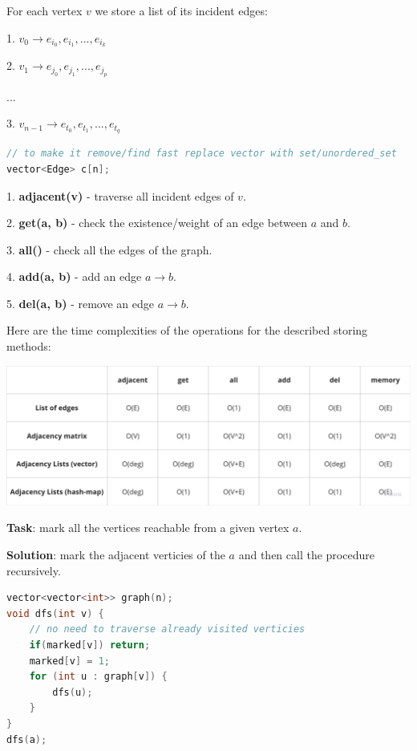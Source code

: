 For each vertex $v$ we store a list of its incident edges:

1. $v_0 \to e_{i_0}, e_{i_1}, ..., e_{i_k}$

2. $v_1 \to e_{j_0}, e_{j_1}, ..., e_{j_p}$

...

3. $v_{n-1} \to e_{t_0}, e_{t_1}, ..., e_{t_q}$

\begin{lstlisting}[language=C++]
// to make it remove/find fast replace vector with set/unordered_set
vector<Edge> c[n];
\end{lstlisting}


1. \textbf{adjacent(v)} - traverse all incident edges of $v$.

2. \textbf{get(a, b)} - check the existence/weight of an edge between $a$ and $b$.

3. \textbf{all()} - check all the edges of the graph.

4. \textbf{add(a, b)} - add an edge $a \to b$.

5. \textbf{del(a, b)} - remove an edge $a \to b$.

Here are the time complexities of the operations for the described storing methods:

\begin{center}
    \includegraphics[scale=0.25]{./assets/14-graphs-and-basic-dfs/1.png}
\end{center}



\textbf{Task}: mark all the vertices reachable from a given vertex $a$.

\textbf{Solution}: mark the adjacent verticies of the $a$ and then call the procedure recursively.

\begin{lstlisting}[language=C++]
vector<vector<int>> graph(n);
void dfs(int v) {
    // no need to traverse already visited verticies
    if(marked[v]) return;
    marked[v] = 1;
    for (int u : graph[v]) {
        dfs(u);
    }
}
dfs(a);
\end{lstlisting}

